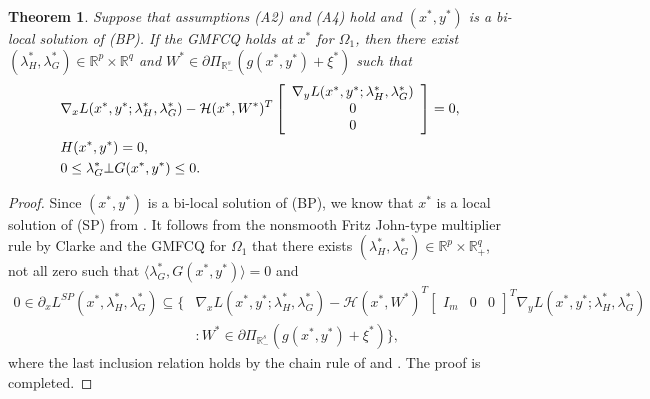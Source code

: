 \documentclass[11pt]{article}
\newtheorem{theorem}{Theorem}[section]
\theoremstyle{definition}
\theoremstyle{remark}
\numberwithin{equation}{section}
\begin{document}
\begin{theorem}\label{theorem dual First-order NOC for SP}
Suppose that assumptions \textnormal{(A2) and \textnormal{(A4)} hold} and  $(x^*,y^*)$ is a bi-local solution of (BP). If the GMFCQ holds at $x^*$ for $\Omega_1$, then there exist  $(\lambda_H^*,\lambda_G^*)\in
      \mathbb{R}^{p}\times\mathbb{R}^{q}$ and $ W^*\in
      \partial\Pi_{\mathbb{R}_{-}^s}(g(x^*,y^*)+\xi^*)$ such that
      \begin{align}
        &   \nabla_{x} L (x^*,y^*;\lambda^*_H,\lambda^*_G)-\mathcal{H}(x^*,W^*)^T\left[\begin{array}{c}
         \nabla_{y} L (x^*,y^*;\lambda^*_H,\lambda^*_G)\\0\\0
                  \end{array}\right]=0,\notag\\
         & H(x^*,y^*)= 0,\label{3-1}\\
        &0\le \lambda_G^*\bot G(x^*,y^*)\le 0.\notag
      \end{align}
\end{theorem}
\begin{proof}
  Since $(x^*,y^*)$ is a bi-local solution of (BP), we  know that $x^*$ is a local solution of (SP) from
  \cite[Remark 3.6]{Liu 25}.
  It follows from
the nonsmooth Fritz John-type multiplier rule by Clarke \cite[Theorem 6.1.1]{Clarke}
 and the GMFCQ for $\Omega_1$ that %
there exists
$(\lambda_H^*,\lambda_G^*)\in  \mathbb{R}^{p}\times\mathbb{R}^{q}_{+}$, not all zero such
that $\langle \lambda_{G}^*, G(x^*,y^*)\rangle= 0$ and
\begin{align*}
 0 \in \partial_xL^{SP}(x^*,\lambda_H^*,\lambda_G^*)\subseteq
  \{&\nabla_xL(x^*,y^*;\lambda_H^*,\lambda_G^*)-\mathcal{H}(x^*,W^*)^T[\begin{array}{ccc}
                             I_m&0&0
                           \end{array}]^T\nabla_yL(x^*,y^*;\lambda_H^*,\lambda_G^*)\\
                           &:W^*\in \partial \Pi_{\mathbb{R}^s_{-}}(g(x^*,y^*)+\xi^*)\},
\end{align*}
where the last inclusion relation holds by the chain rule of \cite[Theorem 10.20]{Clarke 13} and \cite[Proposition 2.4]{Daiyh and Zhanglw}.
The proof is completed.
\end{proof}
\end{document}
